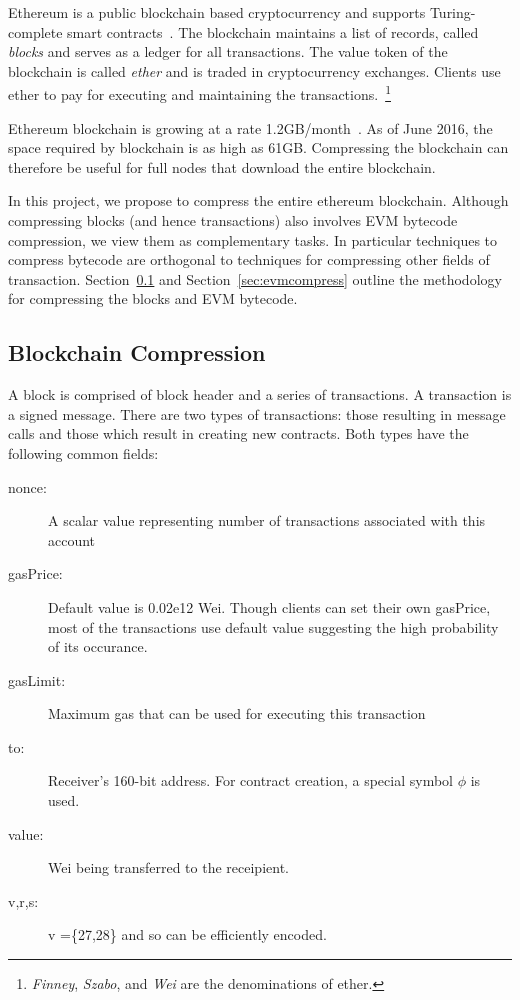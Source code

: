 
Ethereum is a public blockchain based cryptocurrency and supports Turing-complete smart contracts~\cite{ethereum}.
The blockchain maintains a list of records, called \emph{blocks} and serves as a ledger for all transactions.
The value token of the blockchain is called \emph{ether} and 
is traded in cryptocurrency exchanges.
Clients use ether to pay for executing and maintaining the transactions.~\footnote{
\emph{Finney}, \emph{Szabo}, and \emph{Wei} are the denominations of ether.}
 
Ethereum blockchain is growing at a rate 1.2GB/month~\cite{ethdiskspace}.
As of June 2016, the space required by blockchain is as high as 61GB.
Compressing the blockchain can therefore be useful for full nodes that download the entire blockchain.

In this project, we propose to compress the entire ethereum blockchain. 
Although compressing blocks (and hence transactions) also involves EVM bytecode compression, 
we view them as complementary tasks. 
In particular techniques to compress bytecode are orthogonal to techniques for compressing other fields of transaction.
Section~\ref{sec:blockcompress} and 
Section~\ref{sec:evmcompress}  
outline the methodology for compressing the blocks and EVM bytecode.

\subsection{Blockchain Compression}\label{sec:blockcompress}

A block is comprised of block header and a series of transactions. A transaction is a signed message.
There are two types of transactions: those resulting in message calls and those which result in creating new contracts.
Both types have the following common fields:
\begin{description}
  \item[nonce:] A scalar value representing number of transactions associated with this account
  \item[gasPrice:] Default value is 0.02e12 Wei. Though clients can set their own gasPrice, most of the transactions use default value suggesting the high probability of its occurance.
  \item[gasLimit:] Maximum gas that can be used for executing this transaction
  \item[to:] Receiver's 160-bit address. For contract creation, a special symbol $\phi$ is used.
  \item[value:] Wei being transferred to the receipient.
  \item[v,r,s:] v =\{27,28\} and so can be efficiently encoded.
\end{description}

